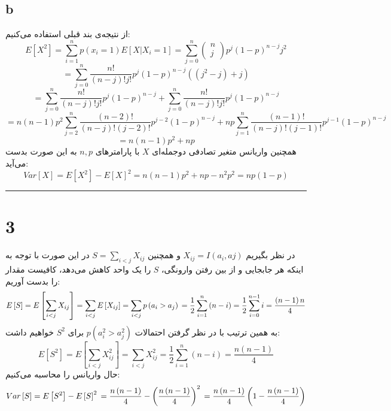 \documentclass{article}
\begin{document}
\subsection*{b}
از نتیجه‌ی بند قبلی استفاده می‌کنیم:
$$E\left[ X^{2}\right] =\sum ^{n}_{i=1}p\left( x_{i}=1\right) E\left[ X| X_{i}=1\right] =\sum ^{n}_{j=0}\begin{pmatrix} n \\ j \end{pmatrix}p^{j}\left( 1-p\right) ^{n-j}j^{2}$$
$$ =\sum ^{n}_{j=0}\dfrac{n!}{\left( n-j\right) !j!}p^{j}\left( 1-p\right) ^{n-j}\left( \left( j^{2}-j\right) +j\right) $$
$$=\sum ^{n}_{j=0}\dfrac{n!}{\left( n-j\right) !j!}p^{j}\left( 1-p\right) ^{n-j}+\sum ^{n}_{j=0}\dfrac{n!}{\left( n-j\right) !j!}p^{j}\left( 1-p\right) ^{n-j}$$
$$ =n\left( n-1\right) p^{2}\sum ^{n}_{j=2}\dfrac{\left( n-2\right) !}{\left( n-j\right) !\left( j-2\right) !}p^{j-2}\left( 1-p\right) ^{n-j}+np\sum ^{n}_{j=1}\dfrac{\left( n-1\right) !}{\left( n-j\right) !\left( j-1\right) !}p^{j-1}\left( 1-p\right) ^{n-j}$$
$$ =n\left( n-1\right) p^{2}+np$$
همچنین واریانس متغیر تصادفی دوجمله‌ای
$X$
با پارامترهای
$n, p$
به این صورت بدست می‌آید:
$$Var\left[ X\right] =E\left[ X^{2}\right] -E\left[ X\right] ^{2}=n\left( n-1\right) p^{2}+np-n^{2}p^{2}=np\left( 1-p\right)$$

\rule{\linewidth}{1pt}
\section*{3}
در نظر بگیریم
$X_{ij}=I\left( a_{i},aj\right)$
و همچنین
$S=\sum _{i <j}X_{ij}$
در این صورت با توجه به اینکه هر جابجایی و از بین رفتن وارونگی،
$S$
را یک واحد کاهش می‌دهد، کافیست مقدار
را بدست آوریم:
$$E\left[ S\right] =E\left[ \sum _{i <j}X_{ij}\right] =\sum _{i <j}E\left[ X_{ij}\right] =\sum _{i <j}p\left( a_{i} >a_{j}\right) \\ =\dfrac{1}{2}\sum ^{n}_{i=1}\left( n-i\right) =\dfrac{1}{2}\sum ^{n-1}_{i=0}i=\dfrac{\left( n-1\right) n}{4}$$
به همین ترتیب با در نظر گرفتن احتمالات
$p( a_{i}^{2} > a_{j}^{2})$
برای 
$S^2$
خواهیم داشت:
$$E\left[ S^{2}\right] =E\left[ \sum _{i <j}X_{ij}^{2}\right] =\sum _{i <j}X_{ij}^{2}=\dfrac{1}{2}\sum ^{n}_{i=1}\left( n-i\right) =\dfrac{n\left( n-1\right) }{4}$$
حال واریانس را محاسبه می‌کنیم:
$$Var\left[ S\right] =E\left[ S^{2}\right] -E\left[ S\right] ^{2}\\ =\dfrac{n\left( n-1\right) }{4}-\left( \dfrac{n\left( n-1\right) }{4}\right) ^{2}\\ =\dfrac{n\left( n-1\right) }{4}\left( 1-\dfrac{n\left( n-1\right) }{4}\right)$$
\end{document}
